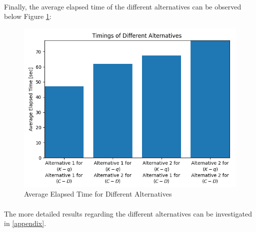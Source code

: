 \documentclass[letterpaper,12pt]{article}
\begin{document}
\paragraph{} Finally, the average elapsed time of the different alternatives can be observed below Figure \ref{fig:timing}:

\begin{figure}[H] 
    \centering \includegraphics[width=0.6\columnwidth]{figures/timing.png}           
                 \caption{Average Elapsed Time for Different Alternatives}                
                    \label{fig:timing}
    \end{figure}
 
\paragraph{} The more detailed results regarding the different alternatives can be investigated in \ref{appendix}.
\end{document}

